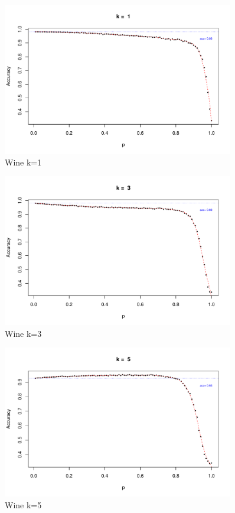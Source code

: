 \documentclass{article}
\begin{document}
\begin{figure}[h!]
 \centering
 \includegraphics[width=0.9\textwidth]{./figures/Wine_k1.pdf}
 \caption{Wine k=1}
 \label{fig:Wine1}
\end{figure}
\begin{figure}[h!]
 \centering
 \includegraphics[width=0.9\textwidth]{./figures/Wine_k3.pdf}
 \caption{Wine k=3}
 \label{fig:Wine3}
\end{figure}
\begin{figure}
 \centering
 \includegraphics[width=0.9\textwidth]{./figures/Wine_k5.pdf}
 \caption{Wine k=5}
 \label{fig:Wine5}
\end{figure}
\end{document}
